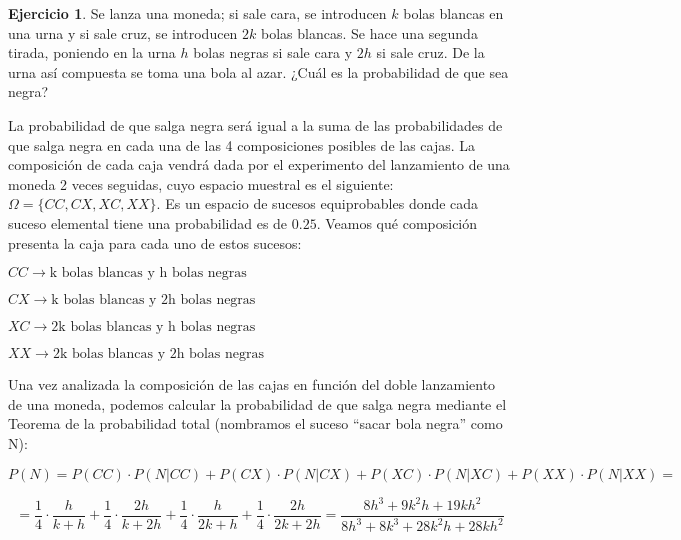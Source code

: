 \documentclass[a4paper, 12pt]{article}
\theoremstyle{definition}
\newtheorem{ej}{Ejercicio}
\begin{document}
\begin{ej}
Se lanza una moneda; si sale cara, se introducen $k$ bolas blancas en una urna y si sale cruz, se
introducen $2k$ bolas blancas. Se hace una segunda tirada, poniendo en la urna $h$ bolas negras
si sale cara y $2h$ si sale cruz. De la urna así compuesta se toma una bola al azar. ¿Cuál es la
probabilidad de que sea negra?


\medskip

La probabilidad de que salga negra será igual a la suma de las probabilidades de que salga negra en cada una de las 4 composiciones posibles de las cajas. La composición de cada caja vendrá dada por el experimento del lanzamiento de una moneda 2 veces seguidas, cuyo espacio muestral es el siguiente: $\Omega = \{CC,CX,XC,XX\}$. Es un espacio de sucesos equiprobables donde cada suceso elemental tiene una probabilidad es de $0.25$. Veamos qué composición presenta la caja para cada uno de estos sucesos:

\begin{center}
    $CC \longrightarrow \text{k bolas blancas y h bolas negras}$
    
    $CX \longrightarrow \text{k bolas blancas y 2h bolas negras}$
    
    $XC \longrightarrow \text{2k bolas blancas y h bolas negras}$
    
    $XX \longrightarrow \text{2k bolas blancas y 2h bolas negras}$
\end{center}

\newpage

Una vez analizada la composición de las cajas en función del doble lanzamiento de una moneda, podemos calcular la probabilidad de que salga negra mediante el Teorema de la probabilidad total (nombramos el suceso ``sacar bola negra'' como N):

\begin{center}
    $P(N) = P(CC) \cdot P(N|CC) + P(CX) \cdot P(N|CX) + P(XC) \cdot P(N|XC) + P(XX) \cdot P(N|XX) = $
\end{center}

\[
    = \frac{1}{4} \cdot \frac{h}{k+h} + \frac{1}{4} \cdot \frac{2h}{k+2h} + \frac{1}{4} \cdot \frac{h}{2k+h} + \frac{1}{4} \cdot \frac{2h}{2k+2h} = \frac{8h^3+9k^{2}h+19kh^2}{8h^3+8k^3+28k^{2}h+28kh^2}
\]
\end{ej}
\end{document}
